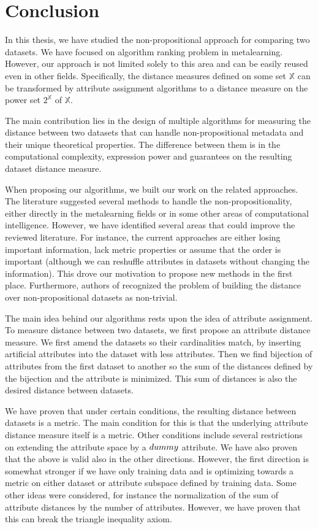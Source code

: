 \chapter{Conclusion}
\label{chapter:conclusion}

In this thesis, we have studied the non-propositional approach for comparing two datasets. We have focused on algorithm ranking problem in metalearning. However, our approach is not limited solely to this area and can be easily reused even in other fields. Specifically, the distance measures defined on some set $\mathbb{X}$ can be transformed by attribute assignment algorithms
to a distance measure on the power set $2^\mathbb{X}$ of $\mathbb{X}.$

The main contribution lies in the design of multiple algorithms for measuring the distance between two datasets that can handle non-propositional metadata and their unique theoretical properties. The difference between them is in the computational complexity, expression power and guarantees on the resulting dataset distance measure.

When proposing our algorithms, we built our work on the related approaches. The literature suggested several methods to handle the non-propositionality, either directly in the metalearning fields or in some other areas of computational intelligence. However, we have identified several areas that could improve the reviewed literature. For instance, the current approaches are either losing important information, lack metric properties or assume that the order is important (although we can reshuffle attributes in datasets without changing the information). This drove our motivation to propose new methods in the first place. Furthermore, authors of \cite{RepresentationalIssuesInMetalearning} recognized the problem of building the distance over non-propositional datasets as non-trivial.

The main idea behind our algorithms rests upon the idea of attribute assignment. To measure distance between two datasets, we first propose an attribute distance measure. We first amend the datasets so their cardinalities match, by inserting artificial attributes into the dataset with less attributes. Then we find bijection of attributes from the first dataset to another so the sum of the distances defined by the bijection and the attribute is minimized. This sum of distances is also the desired distance between datasets.

We have proven that under certain conditions, the resulting distance between datasets is a metric. The main condition for this is that the underlying attribute distance measure itself is a metric. Other conditions include several restrictions on extending the attribute space by a $dummy$ attribute. We have also proven that the above is valid also in the other directions.
However, the first direction is somewhat stronger if we have only training data and is optimizing towards a metric on either dataset or attribute subspace defined by training data.
Some other ideas were considered, for instance the normalization of the sum of attribute distances by the number of attributes. However, we have proven that this can break the triangle inequality axiom.

